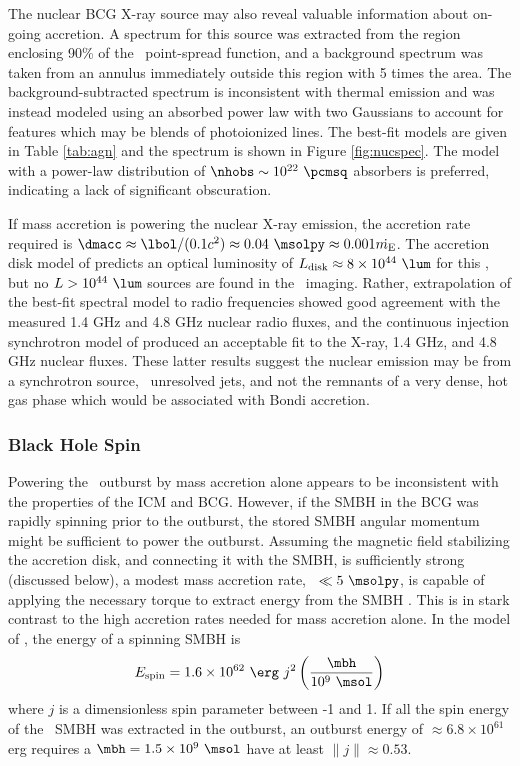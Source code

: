 \documentclass[iop]{emulateapj}
\begin{document}
The nuclear BCG X-ray source may also reveal valuable information
about on-going accretion. A spectrum for this source was extracted
from the region enclosing 90\% of the \cxo\ point-spread function, and
a background spectrum was taken from an annulus immediately outside
this region with 5 times the area. The background-subtracted spectrum
is inconsistent with thermal emission and was instead modeled using an
absorbed power law with two Gaussians to account for features which
may be blends of photoionized lines. The best-fit models are given in
Table \ref{tab:agn} and the spectrum is shown in Figure
\ref{fig:nucspec}. The model with a power-law distribution of $\nhobs
\sim 10^{22} ~\pcmsq$ absorbers is preferred, indicating a lack of
significant obscuration.

If mass accretion is powering the nuclear X-ray emission, the
accretion rate required is $\dmacc \approx \lbol/(0.1 c^2) \approx
0.04 ~\msolpy \approx 0.001 \dme$. The accretion disk model of
\citet{2002NewAR..46..247M} predicts an optical luminosity of $\ldisk
\approx 8 \times 10^{44} ~\lum$ for this \dmacc, but no $L > 10^{44}
~\lum$ sources are found in the \hst\ imaging. Rather, extrapolation
of the best-fit spectral model to radio frequencies showed good
agreement with the measured 1.4 GHz and 4.8 GHz nuclear radio fluxes,
and the continuous injection synchrotron model of
\citet{1987MNRAS.225..335H} produced an acceptable fit to the X-ray,
1.4 GHz, and 4.8 GHz nuclear fluxes. These latter results suggest the
nuclear emission may be from a synchrotron source, \eg\ unresolved
jets, and not the remnants of a very dense, hot gas phase which would
be associated with Bondi accretion.

\subsubsection{Black Hole Spin}

Powering the \rbs\ outburst by mass accretion alone appears to be
inconsistent with the properties of the ICM and BCG. However, if the
SMBH in the BCG was rapidly spinning prior to the outburst, the stored
SMBH angular momentum might be sufficient to power the
outburst. Assuming the magnetic field stabilizing the accretion disk,
and connecting it with the SMBH, is sufficiently strong (discussed
below), a modest mass accretion rate, \eg\ $\ll 5 ~\msolpy$, is
capable of applying the necessary torque to extract energy from the
SMBH \citep{1999ApJ...522..753M}. This is in stark contrast to the
high accretion rates needed for mass accretion alone. In the model of
\citet{1999ApJ...522..753M}, the energy of a spinning SMBH is
\begin{equation}
  E_{\rm{spin}} = 1.6 \times 10^{62} ~{\erg} ~j^2
  \left(\frac{\mbh}{10^9 ~\msol}\right)
\end{equation}
where $j$ is a dimensionless spin parameter between -1 and 1. If all
the spin energy of the \rbs\ SMBH was extracted in the outburst, an
outburst energy of $\approx 6.8 \times 10^{61}$ erg requires a $\mbh =
1.5 \times 10^{9} ~\msol$ have at least $\|j\| \approx 0.53$.
\end{document}
